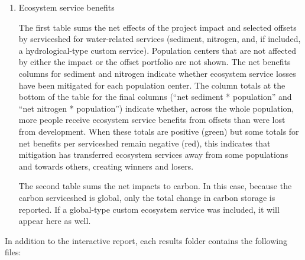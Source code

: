 \documentclass[11pt,letterpaper]{report}
\newenvironment{myenumerate}{%
	\edef\backupindent{\the\parindent}
	\enumerate
	\setlength{\parindent}{\backupindent}
		\setlist[enumerate,1]{label=(\arabic*)}
		\setlist[enumerate,2]{label=(\arabic*)}
}{\endenumerate}
\begin{document}
\begin{myenumerate}
\begin{enumerate}[label=\alph*]
				\item Ecosystem service benefits
				
					The first table sums the net effects of the project impact and selected offsets by serviceshed for water-related services (sediment, nitrogen, and, if included, a hydrological-type custom service). Population centers that are not affected by either the impact or the offset portfolio are not shown. The net benefits columns for sediment and nitrogen indicate whether ecosystem service losses have been mitigated for each population center. The column totals at the bottom of the table for the final columns (``net sediment * population'' and ``net nitrogen * population'') indicate whether, across the whole population, more people receive ecosystem service benefits from offsets than were lost from development. When these totals are positive (green) but some totals for net benefits per serviceshed remain negative (red), this indicates that mitigation has transferred ecosystem services away from some populations and towards others, creating winners and losers.
					
					The second table sums the net impacts to carbon. In this case, because the carbon serviceshed is global, only the total change in carbon storage is reported. If a global-type custom ecosystem service was included, it will appear here as well.
			\end{enumerate}
	\end{myenumerate}

	In addition to the interactive report, each results folder contains the following files:
	
\end{document}
